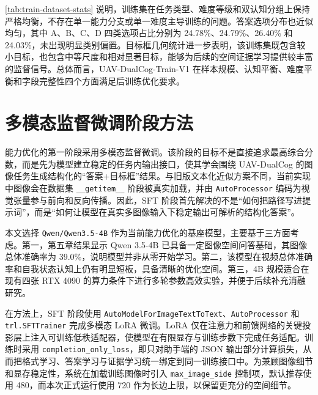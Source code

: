 \autoref{tab:train-dataset-stats} 说明，训练集在任务类型、难度等级和双认知分组上保持严格均衡，不存在单一能力分支或单一难度主导训练的问题。答案选项分布也近似均匀，其中 A、B、C、D 四类选项占比分别为 24.78\%、24.79\%、26.40\% 和 24.03\%，未出现明显类别偏置。目标框几何统计进一步表明，该训练集既包含较小目标，也包含中等尺度和相对显著目标，能够为后续的空间证据学习提供较丰富的监督信号。总体而言，UAV-DualCog-Train-V1 在样本规模、认知平衡、难度平衡和字段完整性四个方面满足后训练优化要求。

\FloatBarrier
\section{多模态监督微调阶段方法}

能力优化的第一阶段采用多模态监督微调。该阶段的目标不是直接追求最高综合分数，而是先为模型建立稳定的任务内输出接口，使其学会围绕 UAV-DualCog 的图像任务生成结构化的“答案+目标框”结果。与旧版文本化近似方案不同，当前实现中图像会在数据集 \texttt{\_\_getitem\_\_} 阶段被真实加载，并由 \texttt{AutoProcessor} 编码为视觉张量参与前向和反向传播。因此，SFT 阶段首先解决的不是“如何把路径写进提示词”，而是“如何让模型在真实多图像输入下稳定输出可解析的结构化答案”。

本文选择 \texttt{Qwen/Qwen3.5-4B} 作为当前能力优化的基座模型，主要基于三方面考虑。第一，第五章结果显示 Qwen 3.5-4B 已具备一定图像空间问答基础，其图像总体准确率为 39.0\%，说明模型并非从零开始学习。第二，该模型在视频总体准确率和自我状态认知上仍有明显短板，具备清晰的优化空间。第三，4B 规模适合在现有四张 RTX 4090 的算力条件下进行多轮参数高效实验，并便于后续补充消融研究。

在方法上，SFT 阶段使用 \texttt{AutoModelForImageTextToText}、\texttt{AutoProcessor} 和 \texttt{trl.SFTTrainer} 完成多模态 LoRA 微调。LoRA 仅在注意力和前馈网络的关键投影层上注入可训练低秩适配器，使模型在有限显存与训练步数下完成任务适配。训练时采用 \texttt{completion\_only\_loss}，即只对助手端的 JSON 输出部分计算损失，从而把格式学习、答案学习与证据学习统一绑定到同一训练接口中。为兼顾图像细节和显存稳定性，系统在加载训练图像时引入 \texttt{max\_image\_side} 控制项，默认推荐使用 480，而本次正式运行使用 720 作为长边上限，以保留更充分的空间细节。

